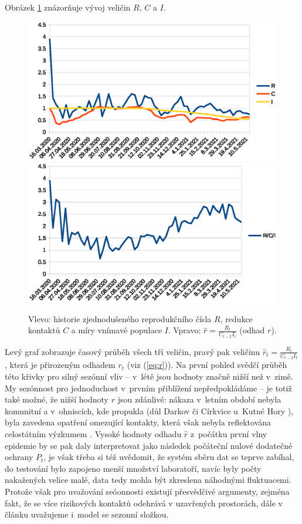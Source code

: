 Obrázek \ref{fig:rci} znázorňuje vývoj veličin $R$, $C$ a $I$.
\begin{figure}
\begin{center}
\includegraphics[scale=0.4]{pic/rc}\includegraphics[scale=0.4]{pic/rci}
\caption{Vlevo: historie zjednodušeného reprodukčního čísla $R$, redukce kontaktů $C$ a míry vnímavé populace $I$. Vpravo: $\hat{r} = \frac{R_{t}}{C_{t-2}I_t}$ (odhad $r$).} 
\label{fig:rci}
\end{center}
\end{figure}
Levý graf zobrazuje časový průběh všech tří veličin, pravý pak veličinu
$\hat{r}_t = \frac{R_{t}}{C_{t-2}I_{t}}$, která je přirozeným odhadem $r_{t}$
(viz (\ref{eq:r})). Na první pohled svědčí průběh této 
křivky pro silný sezónní vliv -- v~létě jsou hodnoty značně
nižší než v~zimě. My sezónnost pro jednoduchost v~prv\-ním přiblížení nepředpokládáme -- je totiž také možné, že nižší hodnoty
$r$ jsou zdánlivé: nákaza v~letním období nebyla komunitní a v~ohniscích,
kde propukla (důl Darkov \cite{darkov} či Církvice u~Kutné Hory \cite{cirkvice}),
byla zavedena opatření omezující kontakty, která však nebyla reflektována
celostátním výzkumem \cite{paqcovid}.
Vysoké hodnoty odhadu $\hat r$ z~počátku první vlny
epidemie by se pak daly interpretovat jako následek počáteční nulové dodatečné
ochrany $P_{t}$, je však třeba si též uvědomit, že systém sběru
dat se teprve zabíhal, do testování bylo zapojeno menší množství laboratoří, navíc byly počty nakažených velice malé, data
tedy mohla být zkreslena náhodnými fluktuacemi. Protože však pro uvažování seóonnosti existují přesvědčivé argumenty, zejména fakt, že se více rizikových kontaktů odehrává v uzavřených prostorách, dále v článku uvažujeme i~model se sezonní složkou.

